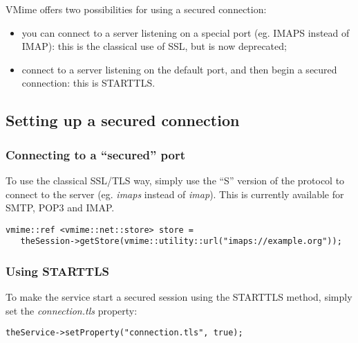 
VMime offers two possibilities for using a secured connection:

\begin{itemize}
\item you can connect to a server listening on a special port (eg. IMAPS
instead of IMAP): this is the classical use of SSL, but is now deprecated;
\item connect to a server listening on the default port, and then begin a
secured connection: this is STARTTLS.
\end{itemize}


\subsection{Setting up a secured connection} %

\subsubsection{Connecting to a ``secured'' port} %

To use the classical SSL/TLS way, simply use the ``S'' version of the protocol
to connect to the server (eg. \emph{imaps} instead of \emph{imap}). This is
currently available for SMTP, POP3 and IMAP.

\begin{lstlisting}
vmime::ref <vmime::net::store> store =
   theSession->getStore(vmime::utility::url("imaps://example.org"));
\end{lstlisting}

\subsubsection{Using STARTTLS} %

To make the service start a secured session using the STARTTLS method, simply
set the \emph{connection.tls} property:

\begin{lstlisting}
theService->setProperty("connection.tls", true);
\end{lstlisting}

